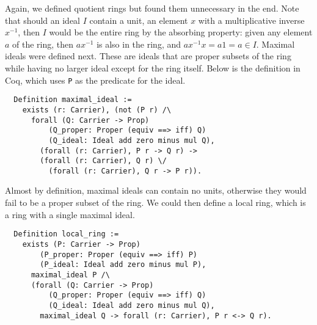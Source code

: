 \documentclass{article}
\begin{document}
Again, we defined quotient rings but found them unnecessary in the end. Note
that should an ideal \(I\) contain a unit, an element \(x\) with a
multiplicative inverse \(x^{-1}\), then \(I\) would be the entire ring by the
absorbing property: given any element \(a\) of the ring, then \(a x^{-1}\) is
also in the ring, and \(a x^{-1} x = a 1 = a\in I\). Maximal ideals were
defined next. These are ideals that are proper subsets of the ring while having
no larger ideal except for the ring itself. Below is the definition in Coq,
which uses \texttt{P} as the predicate for the ideal.
\begin{verbatim}
  Definition maximal_ideal :=
    exists (r: Carrier), (not (P r) /\
      forall (Q: Carrier -> Prop)
          (Q_proper: Proper (equiv ==> iff) Q)
          (Q_ideal: Ideal add zero minus mul Q),
        (forall (r: Carrier), P r -> Q r) ->
        (forall (r: Carrier), Q r) \/
          (forall (r: Carrier), Q r -> P r)).
\end{verbatim}
Almost by definition, maximal ideals can contain no units, otherwise they would
fail to be a proper subset of the ring. We could then define a local ring,
which is a ring with a single maximal ideal.
\begin{verbatim}
  Definition local_ring :=
    exists (P: Carrier -> Prop)
        (P_proper: Proper (equiv ==> iff) P)
        (P_ideal: Ideal add zero minus mul P),
      maximal_ideal P /\
      (forall (Q: Carrier -> Prop)
          (Q_proper: Proper (equiv ==> iff) Q)
          (Q_ideal: Ideal add zero minus mul Q),
        maximal_ideal Q -> forall (r: Carrier), P r <-> Q r).
\end{verbatim}
\end{document}

